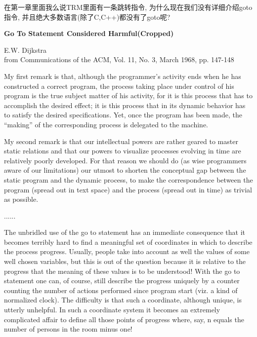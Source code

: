 \begin{bonus}
	在第一章里面我么说TRM里面有一条跳转指令, 为什么现在我们没有详细介绍goto指令, 并且绝大多数语言(除了C,C++)都没有了goto呢?
\end{bonus}
\newpage
\begin{pas}
	\begin{center}
		\large \textbf{Go To Statement Considered Harmful(Cropped)}
	\end{center}
	\begin{center}
		E.W. Dijkstra\\
		from Communications of the ACM, Vol. 11, No. 3, March 1968, pp. 147-148
	\end{center}
	My first remark is that, although the programmer's activity ends when he has constructed a correct program, the process taking place under control of his program is the true subject matter of his activity, for it is this process that has to accomplish the desired effect; it is this process that in its dynamic behavior has to satisfy the desired specifications. Yet, once the program has been made, the ``making'' of the corresponding process is delegated to the machine.
	
	My second remark is that our intellectual powers are rather geared to master static relations and that our powers to visualize processes evolving in time are relatively poorly developed. For that reason we should do (as wise programmers aware of our limitations) our utmost to shorten the conceptual gap between the static program and the dynamic process, to make the correspondence between the program (spread out in text space) and the process (spread out in time) as trivial as possible.
	
	......
	
	The unbridled use of the go to statement has an immediate consequence that it becomes terribly hard to find a meaningful set of coordinates in which to describe the process progress. Usually, people take into account as well the values of some well chosen variables, but this is out of the question because it is relative to the progress that the meaning of these values is to be understood! With the go to statement one can, of course, still describe the progress uniquely by a counter counting the number of actions performed since program start (viz. a kind of normalized clock). The difficulty is that such a coordinate, although unique, is utterly unhelpful. In such a coordinate system it becomes an extremely complicated affair to define all those points of progress where, say, n equals the number of persons in the room minus one!


\end{pas}
